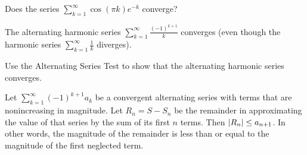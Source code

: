 \documentclass[../mathNotesPreamble]{subfiles}
\begin{document}
  \begin{ex*}
    Does the series $\displaystyle\sum_{k=1}^\infty \cos(\pi k)e^{-k}$ converge? 
  \end{ex*}
  \pagebreak

  \begin{thmBox*}
    The alternating harmonic series $\displaystyle\sum_{k=1}^\infty \frac{(-1)^{k+1}}{k}$ converges (even though the harmonic series $\displaystyle\sum_{k=1}^\infty \frac{1}{k}$ diverges).
  \end{thmBox*}
  \begin{ex*}
    Use the Alternating Series Test to show that the alternating harmonic series converges.
  \end{ex*}
  \pagebreak

  \begin{thmBox*}
    Let $\displaystyle\sum_{k=1}^\infty (-1)^{k+1} a_k$ be a convergent alternating series with terms that are nonincreasing in magnitude. Let $R_n=S-S_n$ be the remainder in approximating the value of that series  by the sum of its first $n$ terms. Then ${\left\vert R_n\right\vert}\leq a_{n+1}$. In other words, the magnitude of the remainder is less than or equal to the magnitude of the first neglected term.
  \end{thmBox*}

  
\end{document}
